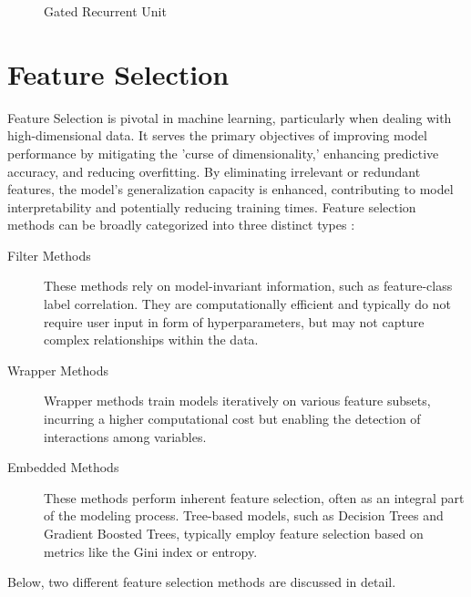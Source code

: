\documentclass[12pt, a4paper, headinclude, twoside, plainheadsepline, open=right, numbers=noenddot, hidelinks, toc=listof, toc=bibliography]{scrreprt}
\begin{document}
\begin{figure}
\caption{Gated Recurrent Unit}
\label{fig:gru}
\end{figure}


\section{Feature Selection}
\label{sec:fs_algos}

Feature Selection is pivotal in machine learning, particularly when dealing with high-dimensional data. It serves the primary objectives of improving model performance by mitigating the 'curse of dimensionality,' enhancing predictive accuracy, and reducing overfitting. By eliminating irrelevant or redundant features, the model's generalization capacity is enhanced, contributing to model interpretability and potentially reducing training times.
Feature selection methods can be broadly categorized into three distinct types \cite{jovicReviewFeatureSelection2015}:
\begin{description}
\item[Filter Methods] These methods rely on model-invariant information, such as feature-class label correlation. They are computationally efficient and typically do not require user input in form of hyperparameters, but may not capture complex relationships within the data.
\item[Wrapper Methods] Wrapper methods train models iteratively on various feature subsets, incurring a higher computational cost but enabling the detection of interactions among variables.
\item[Embedded Methods] These methods perform inherent feature selection, often as an integral part of the modeling process. Tree-based models, such as Decision Trees and Gradient Boosted Trees, typically employ feature selection based on metrics like the Gini index or entropy.
\end{description}
Below, two different feature selection methods are discussed in detail.
\end{document}
